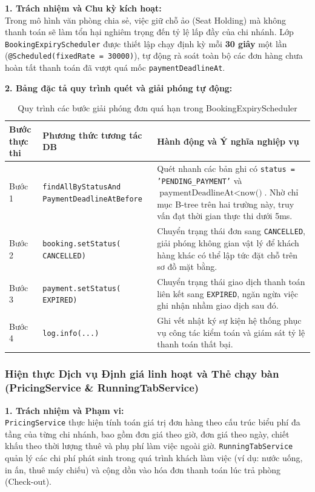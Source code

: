 \noindent\textbf{1. Trách nhiệm và Chu kỳ kích hoạt:}\\
Trong mô hình văn phòng chia sẻ, việc giữ chỗ ảo (Seat Holding) mà không thanh toán sẽ làm tổn hại nghiêm trọng đến tỷ lệ lấp đầy của chi nhánh. Lớp \texttt{BookingExpiryScheduler} được thiết lập chạy định kỳ mỗi \textbf{30 giây} một lần (\texttt{@Scheduled(fixedRate = 30000)}), tự động rà soát toàn bộ các đơn hàng chưa hoàn tất thanh toán đã vượt quá mốc \texttt{paymentDeadlineAt}.

\noindent\textbf{2. Bảng đặc tả quy trình quét và giải phóng tự động:}

\begin{table}[H]
\centering
\caption{Quy trình các bước giải phóng đơn quá hạn trong BookingExpiryScheduler}
\label{tab:spec-scheduler}
\renewcommand{\arraystretch}{1.3}
\begin{tabular}{|p{1.8cm}|p{4.5cm}|p{8.7cm}|}
\hline
\textbf{Bước thực thi} & \textbf{Phương thức tương tác DB} & \textbf{Hành động và Ý nghĩa nghiệp vụ} \\
\hline
Bước 1 & \texttt{findAllByStatusAnd PaymentDeadlineAtBefore} & Quét nhanh các bản ghi có \texttt{status = 'PENDING\_PAYMENT'} và $\text{paymentDeadlineAt} < \text{now()}$. Nhờ chỉ mục B-tree trên hai trường này, truy vấn đạt thời gian thực thi dưới 5ms. \\
\hline
Bước 2 & \texttt{booking.setStatus( CANCELLED)} & Chuyển trạng thái đơn sang \texttt{CANCELLED}, giải phóng không gian vật lý để khách hàng khác có thể lập tức đặt chỗ trên sơ đồ mặt bằng. \\
\hline
Bước 3 & \texttt{payment.setStatus( EXPIRED)} & Chuyển trạng thái giao dịch thanh toán liên kết sang \texttt{EXPIRED}, ngăn ngừa việc ghi nhận nhầm giao dịch sau đó. \\
\hline
Bước 4 & \texttt{log.info(...)} & Ghi vết nhật ký sự kiện hệ thống phục vụ công tác kiểm toán và giám sát tỷ lệ thanh toán thất bại. \\
\hline
\end{tabular}
\end{table}

\subsubsection{Hiện thực Dịch vụ Định giá linh hoạt và Thẻ chạy bàn (PricingService \& RunningTabService)}

\noindent\textbf{1. Trách nhiệm và Phạm vi:}\\
\texttt{PricingService} thực hiện tính toán giá trị đơn hàng theo cấu trúc biểu phí đa tầng của từng chi nhánh, bao gồm đơn giá theo giờ, đơn giá theo ngày, chiết khấu theo thời lượng thuê và phụ phí làm việc ngoài giờ. \texttt{RunningTabService} quản lý các chi phí phát sinh trong quá trình khách làm việc (ví dụ: nước uống, in ấn, thuê máy chiếu) và cộng dồn vào hóa đơn thanh toán lúc trả phòng (Check-out).

